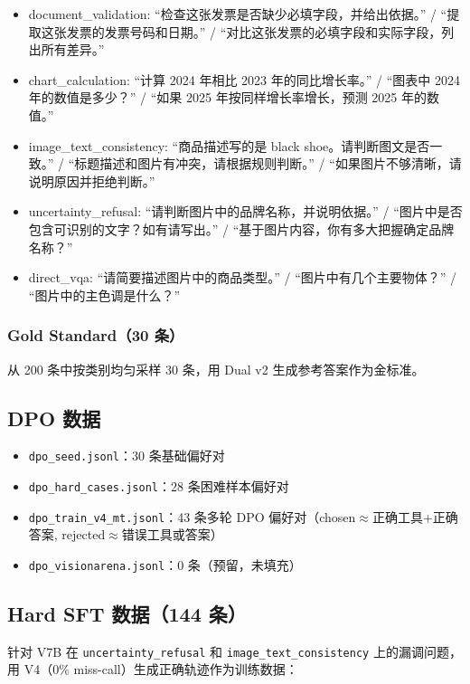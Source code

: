 \documentclass[12pt,a4paper]{ctexart}
\begin{document}
\begin{itemize}[nosep]
  \item document\_validation: ``检查这张发票是否缺少必填字段，并给出依据。'' / ``提取这张发票的发票号码和日期。'' / ``对比这张发票的必填字段和实际字段，列出所有差异。''
  \item chart\_calculation: ``计算 2024 年相比 2023 年的同比增长率。'' / ``图表中 2024 年的数值是多少？'' / ``如果 2025 年按同样增长率增长，预测 2025 年的数值。''
  \item image\_text\_consistency: ``商品描述写的是 black shoe。请判断图文是否一致。'' / ``标题描述和图片有冲突，请根据规则判断。'' / ``如果图片不够清晰，请说明原因并拒绝判断。''
  \item uncertainty\_refusal: ``请判断图片中的品牌名称，并说明依据。'' / ``图片中是否包含可识别的文字？如有请写出。'' / ``基于图片内容，你有多大把握确定品牌名称？''
  \item direct\_vqa: ``请简要描述图片中的商品类型。'' / ``图片中有几个主要物体？'' / ``图片中的主色调是什么？''
\end{itemize}

\subsubsection{Gold Standard（30 条）}

从 200 条中按类别均匀采样 30 条，用 Dual v2 生成参考答案作为金标准。

\subsection{DPO 数据}

\begin{itemize}[nosep]
  \item \texttt{dpo\_seed.jsonl}：30 条基础偏好对
  \item \texttt{dpo\_hard\_cases.jsonl}：28 条困难样本偏好对
  \item \texttt{dpo\_train\_v4\_mt.jsonl}：43 条多轮 DPO 偏好对（chosen$\approx$正确工具+正确答案, rejected$\approx$错误工具或答案）
  \item \texttt{dpo\_visionarena.jsonl}：0 条（预留，未填充）
\end{itemize}

\subsection{Hard SFT 数据（144 条）}

针对 V7B 在 \texttt{uncertainty\_refusal} 和 \texttt{image\_text\_consistency} 上的漏调问题，用 V4（0\% miss-call）生成正确轨迹作为训练数据：
\end{document}
